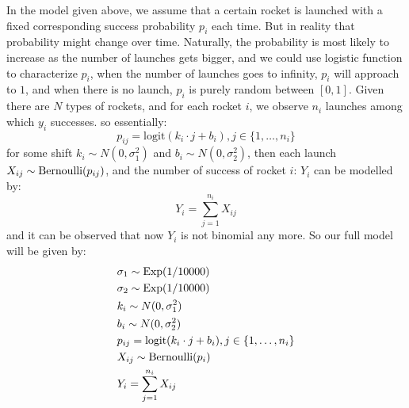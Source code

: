 \documentclass{article}
\begin{document}
In the model given above, we assume that a certain rocket is launched with a fixed corresponding success probability $p_i$ each time. But in reality that probability might change over time. Naturally, the probability is most likely to increase as the number of launches gets bigger, and we could use logistic function to characterize $p_i$, when the number of launches goes to infinity, $p_i$ will approach to $1$, and when there is no launch, $p_i$ is purely random between $[0,1]$. Given there are $N$ types of rockets, and for each rocket $i$, we observe $n_i$ launches among which $y_i$ successes. so essentially:
\begin{equation}
p_{ij} = \text{logit}(k_i \cdot j + b_i), j \in \{1, \ldots, n_i\}
\end{equation}for some shift $k_i \sim N(0, \sigma_1^2)$ and $b_i \sim N(0, \sigma_2^2)$, then each launch $X_{ij} \sim \operatorname{Bernoulli}(p_{ij})$, and the number of success of rocket $i$: $Y_i$ can be modelled by:
\begin{equation}
Y_i = \sum_{j=1}^{n_i} X_{ij}
\end{equation}and it can be observed that now $Y_i$ is not binomial any more.
So our full model will be given by:
\begin{align*}
& \sigma_1 \sim \operatorname{Exp}(1/10000)\\
& \sigma_2 \sim \operatorname{Exp}(1/10000)\\
& k_i \sim N(0, \sigma_1^2)\\
& b_i \sim N(0, \sigma_2^2)\\
& p_{ij} = \text{logit}(k_i \cdot j + b_i), j \in \{1, \ldots, n_i\}\\
&X_{ij} \sim \operatorname{Bernoulli}(p_i)\\
&Y_i = \sum_{j=1}^{n_i} X_{ij}
\end{align*}

 
\end{document}
